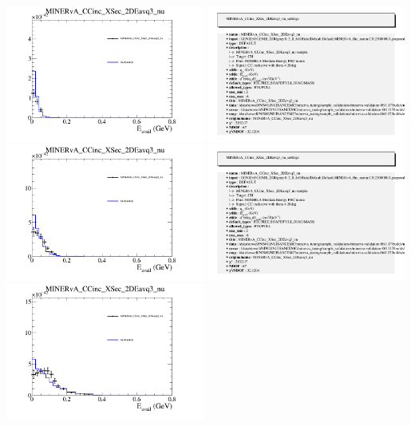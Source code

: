 \documentclass{article}
\begin{document}
\centering
\includegraphics[width=0.49\textwidth]{figures/nuisance_MINERvA_CCinc_XSec_2DEavq3_nu_slice_0_comp.png}
\includegraphics[width=0.49\textwidth]{figures/nuisance_MINERvA_CCinc_XSec_2DEavq3_nu_info.png}
\centering
\includegraphics[width=0.49\textwidth]{figures/nuisance_MINERvA_CCinc_XSec_2DEavq3_nu_slice_1_comp.png}
\includegraphics[width=0.49\textwidth]{figures/nuisance_MINERvA_CCinc_XSec_2DEavq3_nu_info.png}
\centering
\includegraphics[width=0.49\textwidth]{figures/nuisance_MINERvA_CCinc_XSec_2DEavq3_nu_slice_2_comp.png}
\end{document}
